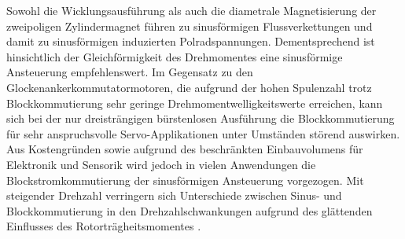 Sowohl die Wicklungsausführung als auch die diametrale Magnetisierung der zweipoligen Zylindermagnet führen zu sinusförmigen Flussverkettungen und damit zu sinusförmigen induzierten Polradspannungen. Dementsprechend ist hinsichtlich der Gleichförmigkeit des Drehmomentes eine sinusförmige Ansteuerung empfehlenswert. Im Gegensatz zu den Glockenankerkommutatormotoren, die aufgrund der hohen Spulenzahl trotz Blockkommutierung sehr geringe Drehmomentwelligkeitswerte erreichen, kann sich bei der nur dreisträngigen bürstenlosen Ausführung die Blockkommutierung für sehr anspruchsvolle Servo-Applikationen unter Umständen störend auswirken. Aus Kostengründen sowie aufgrund des beschränkten Einbauvolumens für Elektronik und Sensorik wird jedoch in vielen Anwendungen die Blockstromkommutierung der sinusförmigen Ansteuerung vorgezogen. Mit steigender Drehzahl verringern sich Unterschiede zwischen Sinus- und Blockkommutierung in den Drehzahlschwankungen aufgrund des glättenden Einflusses des Rotorträgheitsmomentes \parencite[S.  78]{Stölting2011}.


